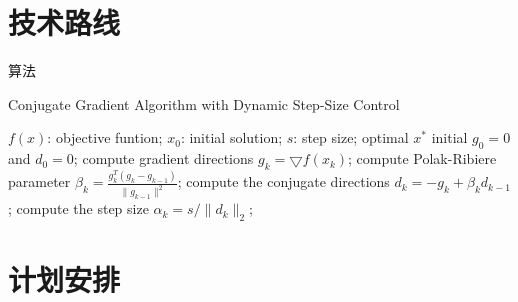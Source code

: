 \documentclass{beamer}
\begin{document}
\section{技术路线}

\begin{frame}{算法}
    \begin{algorithm}[H]  
        \caption{Conjugate Gradient Algorithm with Dynamic Step-Size Control}  
        \label{alg::conjugateGradient}  
        \begin{algorithmic}[1]  
          \Require  
            $f(x)$: objective funtion;  
            $x_0$: initial solution;  
            $s$: step size;  
          \Ensure  
            optimal $x^{*}$  
          \State initial $g_0=0$ and $d_0=0$;  
          \Repeat  
            \State compute gradient directions $g_k=\bigtriangledown f(x_k)$;  
            \State compute Polak-Ribiere parameter $\beta_k=\frac{g_k^{T}(g_k-g_{k-1})}{\parallel g_{k-1} \parallel^{2}}$;  
            \State compute the conjugate directions $d_k=-g_k+\beta_k d_{k-1}$;  
            \State compute the step size $\alpha_k=s/\parallel d_k \parallel_{2}$;  
        \end{algorithmic}  
      \end{algorithm}  
\end{frame}

\section{计划安排}
\end{document}
